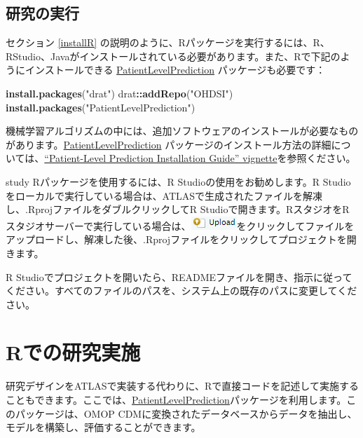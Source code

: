 \documentclass[
  11pt]{book}
\newenvironment{Shaded}{\begin{snugshade}}{\end{snugshade}}
\newcommand{\FunctionTok}[1]{\textcolor[rgb]{0.13,0.29,0.53}{\textbf{#1}}}
\newcommand{\NormalTok}[1]{#1}
\newcommand{\SpecialCharTok}[1]{\textcolor[rgb]{0.81,0.36,0.00}{\textbf{#1}}}
\newcommand{\StringTok}[1]{\textcolor[rgb]{0.31,0.60,0.02}{#1}}
\theoremstyle{definition}
\theoremstyle{definition}
\theoremstyle{definition}
\theoremstyle{definition}
\theoremstyle{remark}
\begin{document}
\subsection{研究の実行}\label{ux7814ux7a76ux306eux5b9fux884c}

セクション \ref{installR} の説明のように、Rパッケージを実行するには、R、RStudio、Javaがインストールされている必要があります。また、Rで下記のようにインストールできる \href{https://ohdsi.github.io/PatientLevelPrediction/}{PatientLevelPrediction} パッケージも必要です：

\begin{Shaded}
\begin{Highlighting}[]
\FunctionTok{install.packages}\NormalTok{(}\StringTok{"drat"}\NormalTok{)}
\NormalTok{drat}\SpecialCharTok{::}\FunctionTok{addRepo}\NormalTok{(}\StringTok{"OHDSI"}\NormalTok{)}
\FunctionTok{install.packages}\NormalTok{(}\StringTok{"PatientLevelPrediction"}\NormalTok{)}
\end{Highlighting}
\end{Shaded}

機械学習アルゴリズムの中には、追加ソフトウェアのインストールが必要なものがあります。\href{https://ohdsi.github.io/PatientLevelPrediction/}{PatientLevelPrediction} パッケージのインストール方法の詳細については、\href{https://ohdsi.github.io/PatientLevelPrediction/articles/InstallationGuide.html}{``Patient-Level Prediction Installation Guide'' vignette}を参照ください。

study Rパッケージを使用するには、R Studioの使用をお勧めします。R Studioをローカルで実行している場合は、ATLASで生成されたファイルを解凍し、.RprojファイルをダブルクリックしてR Studioで開きます。RスタジオをRスタジオサーバーで実行している場合は、\includegraphics{images/PopulationLevelEstimation/upload.png}をクリックしてファイルをアップロードし、解凍した後、.Rprojファイルをクリックしてプロジェクトを開きます。

R Studioでプロジェクトを開いたら、READMEファイルを開き、指示に従ってください。すべてのファイルのパスを、システム上の既存のパスに変更してください。

\section{Rでの研究実施}\label{rux3067ux306eux7814ux7a76ux5b9fux65bd}

研究デザインをATLASで実装する代わりに、Rで直接コードを記述して実施することもできます。ここでは、\href{https://ohdsi.github.io/PatientLevelPrediction/}{PatientLevelPrediction}パッケージを利用します。このパッケージは、OMOP CDMに変換されたデータベースからデータを抽出し、モデルを構築し、評価することができます。
\end{document}
